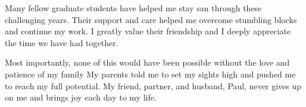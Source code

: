 \documentclass{ucbthesis}
\begin{document}
\begin{frontmatter}
\begin{acknowledgements}
Many fellow graduate students have helped me stay san through these challenging years. Their support and care helped me overcome stumbling blocks and continue my work. I greatly value their friendship and I deeply appreciate the time we have had together.

Most importantly, none of this would have been possible without the love and patience of my family My parents told me to set my sights high and pushed me to reach my full potential. My friend, partner, and husband, Paul, never gives up on me and brings joy each day to my life.
\end{acknowledgements}

\end{frontmatter}



\pagestyle{headings}











\printbibliography

\appendix
 

\end{document}
